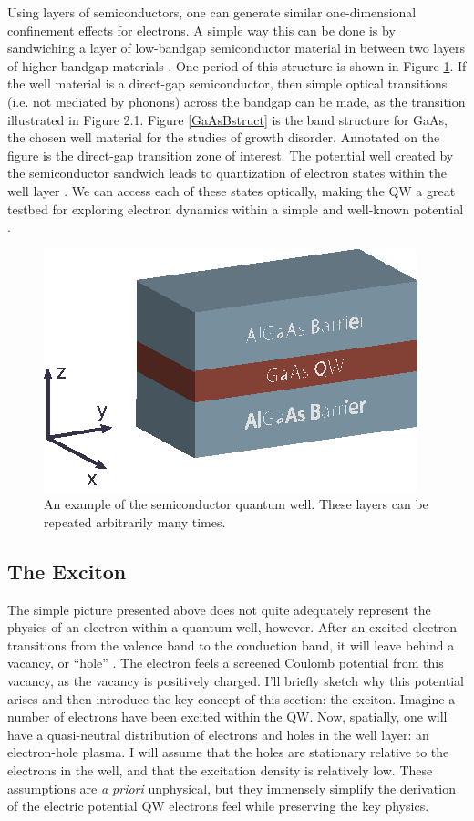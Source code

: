 \indent Using layers of semiconductors, one can generate similar one-dimensional confinement effects for electrons. A simple way this can be done is by sandwiching a layer of low-bandgap semiconductor material in between two layers of higher bandgap materials \cite{davies}. One period of this structure is shown in Figure \ref{block}. If the well material is a direct-gap semiconductor, then simple optical transitions (i.e. not mediated by phonons) across the bandgap can be made, as the transition illustrated in Figure 2.1. Figure \ref{GaAsBstruct} is the band structure for GaAs, the chosen well material for the studies of growth disorder. Annotated on the figure is the direct-gap transition zone of interest. The potential well created by the semiconductor sandwich leads to quantization of electron states within the well layer \cite{miller, davies, stevereview}. We can access each of these states optically, making the QW a great testbed for exploring electron dynamics within a simple and well-known potential \cite{stevereview}. 




\begin{figure}[h!]
\centering
\includegraphics[width = .4\textwidth]{Well.eps}
\caption{\doublespacing An example of the semiconductor quantum well. These layers can be repeated arbitrarily many times.}
\label{block}
\end{figure}

\newpage
\subsection{The Exciton}

\indent The simple picture presented above does not quite adequately represent the physics of an electron within a quantum well, however. After an excited electron transitions from the valence band to the conduction band, it will leave behind a vacancy, or ``hole'' \cite{miller, davies}. The electron feels a screened Coulomb potential from this vacancy, as the vacancy is positively charged. I'll briefly sketch why this potential arises and then introduce the key concept of this section: the exciton. Imagine a number of electrons have been excited within the QW. Now, spatially, one will have a quasi-neutral distribution of electrons and holes in the well layer: an electron-hole plasma. I will assume that the holes are stationary relative to the electrons in the well, and that the excitation density is relatively low. These assumptions are \textit{a priori} unphysical, but they immensely simplify the derivation of the electric potential QW electrons feel while preserving the key physics. 

